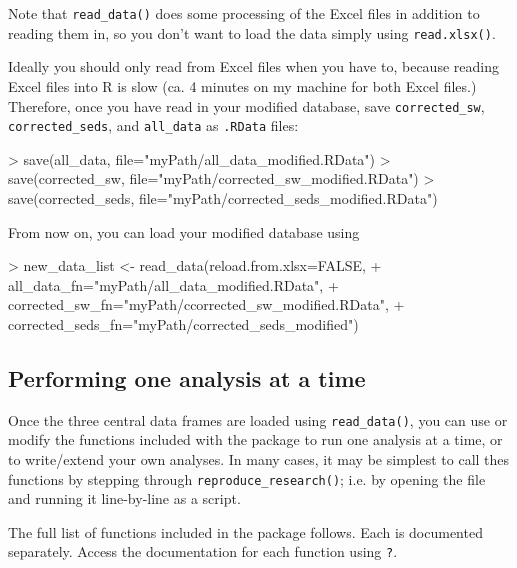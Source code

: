 \documentclass{article}
\begin{document}
Note that \texttt{read\_data()} does some processing of the Excel files in addition to reading them in, so you don't want to load the data simply using \texttt{read.xlsx()}.

Ideally you should only read from Excel files when you have to, because reading Excel files into R is slow (ca. 4 minutes on my machine for both Excel files.) Therefore, once you have read in your modified database, save \texttt{corrected\_sw}, \texttt{corrected\_seds}, and \texttt{all\_data} as \texttt{.RData} files:

\begin{Schunk}
\begin{Sinput}
> save(all_data, file="myPath/all_data_modified.RData")
> save(corrected_sw, file="myPath/corrected_sw_modified.RData")
> save(corrected_seds, file="myPath/corrected_seds_modified.RData")
\end{Sinput}
\end{Schunk}

From now on, you can load your modified database using

\begin{Schunk}
\begin{Sinput}
> new_data_list <- read_data(reload.from.xlsx=FALSE,
+                            all_data_fn="myPath/all_data_modified.RData",
+                            corrected_sw_fn="myPath/ccorrected_sw_modified.RData",
+                            corrected_seds_fn="myPath/corrected_seds_modified")
\end{Sinput}
\end{Schunk}

\subsection{Performing one analysis at a time}
Once the three central data frames are loaded using \texttt{read\_data()}, you can use or modify the functions included with the package to run one analysis at a time, or to write/extend your own analyses. In many cases, it may be simplest to call thes functions by stepping through \texttt{reproduce\_research()}; i.e. by opening the file and running it line-by-line as a script.

The full list of functions included in the package follows. Each is documented separately. Access the documentation for each function using \texttt{?}. 
\end{document}

